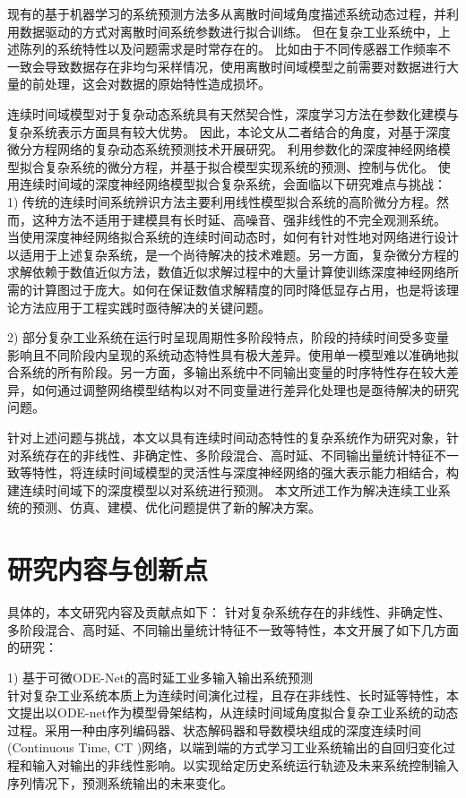 现有的基于机器学习的系统预测方法多从离散时间域角度描述系统动态过程，并利用数据驱动的方式对离散时间系统参数进行拟合训练。
但在复杂工业系统中，上述陈列的系统特性以及问题需求是时常存在的。
比如由于不同传感器工作频率不一致会导致数据存在非均匀采样情况，使用离散时间域模型之前需要对数据进行大量的前处理，这会对数据的原始特性造成损坏。

连续时间域模型对于复杂动态系统具有天然契合性，深度学习方法在参数化建模与复杂系统表示方面具有较大优势。
因此，本论文从二者结合的角度，对基于深度微分方程网络的复杂动态系统预测技术开展研究。
利用参数化的深度神经网络模型拟合复杂系统的微分方程，并基于拟合模型实现系统的预测、控制与优化。
使用连续时间域的深度神经网络模型拟合复杂系统，会面临以下研究难点与挑战：
1) 传统的连续时间系统辨识方法主要利用线性模型拟合系统的高阶微分方程。然而，这种方法不适用于建模具有长时延、高噪音、强非线性的不完全观测系统。
当使用深度神经网络拟合系统的连续时间动态时，如何有针对性地对网络进行设计以适用于上述复杂系统，是一个尚待解决的技术难题。另一方面，复杂微分方程的求解依赖于数值近似方法，数值近似求解过程中的大量计算使训练深度神经网络所需的计算图过于庞大。如何在保证数值求解精度的同时降低显存占用，也是将该理论方法应用于工程实践时亟待解决的关键问题。

2) 部分复杂工业系统在运行时呈现周期性多阶段特点，阶段的持续时间受多变量影响且不同阶段内呈现的系统动态特性具有极大差异。使用单一模型难以准确地拟合系统的所有阶段。另一方面，多输出系统中不同输出变量的时序特性存在较大差异，如何通过调整网络模型结构以对不同变量进行差异化处理也是亟待解决的研究问题。

针对上述问题与挑战，本文以具有连续时间动态特性的复杂系统作为研究对象，针对系统存在的非线性、非确定性、多阶段混合、高时延、不同输出量统计特征不一致等特性，将连续时间域模型的灵活性与深度神经网络的强大表示能力相结合，构建连续时间域下的深度模型以对系统进行预测。
本文所述工作为解决连续工业系统的预测、仿真、建模、优化问题提供了新的解决方案。
\section{研究内容与创新点}
具体的，本文研究内容及贡献点如下：
针对复杂系统存在的非线性、非确定性、多阶段混合、高时延、不同输出量统计特征不一致等特性，本文开展了如下几方面的研究：

1) 基于可微ODE-Net的高时延工业多输入输出系统预测 \\
针对复杂工业系统本质上为连续时间演化过程，且存在非线性、长时延等特性，本文提出以ODE-net作为模型骨架结构，从连续时间域角度拟合复杂工业系统的动态过程。采用一种由序列编码器、状态解码器和导数模块组成的深度连续时间(Continuous Time, CT )网络，以端到端的方式学习工业系统输出的自回归变化过程和输入对输出的非线性影响。以实现给定历史系统运行轨迹及未来系统控制输入序列情况下，预测系统输出的未来变化。

